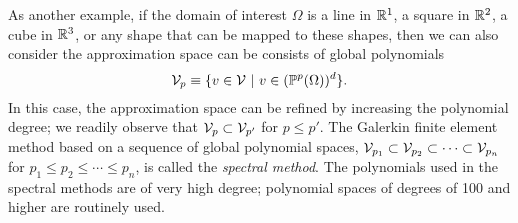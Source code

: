 As another example, if the domain of interest $\Omega$ is a line in $\mathbb{R}^1$, a square in $\mathbb{R}^2$, a cube in $\mathbb{R}^3$, or any shape that can be mapped to these shapes, then we can also consider the approximation space can be consists of global polynomials
\begin{equation*}
  \mathcal{V}_p \equiv \{ v \in \mathcal{V} \ | \ v \in (\mathbb{P}^p(\Omega))^d \}.
\end{equation*}
In this case, the approximation space can be refined by increasing the polynomial degree; we readily observe that $\mathcal{V}_{p} \subset \mathcal{V}_{p'}$ for $p \leq p'$. The Galerkin finite element method based on a sequence of global polynomial spaces, $\mathcal{V}_{p_1} \subset \mathcal{V}_{p_2} \subset \cdots \subset \mathcal{V}_{p_n}$ for $p_1 \leq p_2 \leq \cdots \leq p_n$, is called the \emph{spectral method}.  The polynomials used in the spectral methods are of very high degree; polynomial spaces of degrees of 100 and higher are routinely used.

